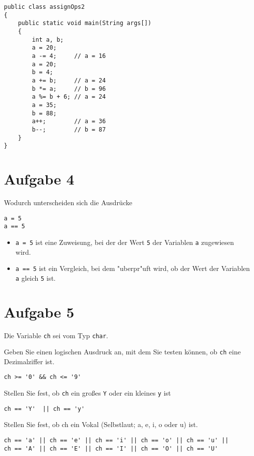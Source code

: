 \documentclass[10pt, oneside]{article}
\begin{document}
\begin{verbatim}
public class assignOps2
{
    public static void main(String args[])
    {
        int a, b;
        a = 20;
        a -= 4;     // a = 16
        a = 20;
        b = 4;
        a += b;     // a = 24
        b *= a;     // b = 96
        a %= b + 6; // a = 24
        a = 35;
        b = 88;
        a++;        // a = 36
        b--;        // b = 87
    }
}
\end{verbatim}

\section{Aufgabe 4}

Wodurch unterscheiden sich die Ausdrücke

\begin{verbatim}
a = 5
a == 5
\end{verbatim}

\begin{itemize}
    \item \verb+a = 5+ ist eine Zuweisung, bei der der Wert \verb+5+ der
        Variablen \verb+a+ zugewiesen wird.
    \item \verb+a == 5+ ist ein Vergleich, bei dem "uberpr"uft wird, ob der
        Wert der Variablen \verb+a+ gleich \verb+5+ ist.
\end{itemize}

\section{Aufgabe 5}

Die Variable \verb+ch+ sei vom Typ \verb+char+.

Geben Sie einen logischen Ausdruck an, mit dem Sie testen können, ob \verb+ch+ eine
Dezimalziffer ist.

\begin{verbatim}
ch >= '0' && ch <= '9'
\end{verbatim}

Stellen Sie fest, ob \verb+ch+ ein großes \verb+Y+ oder ein kleines \verb+y+ ist

\begin{verbatim}
ch == 'Y'  || ch == 'y'
\end{verbatim}

Stellen Sie fest, ob ch ein Vokal (Selbstlaut; a, e, i, o oder u) ist.

\begin{verbatim}
ch == 'a' || ch == 'e' || ch == 'i' || ch == 'o' || ch == 'u' ||
ch == 'A' || ch == 'E' || ch == 'I' || ch == 'O' || ch == 'U'
\end{verbatim}
\end{document}
